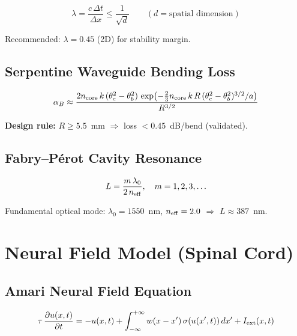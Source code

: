 \documentclass[12pt, a4paper]{article}
\begin{document}
\begin{equation}\label{eq:cfl}
  \lambda = \frac{c\,\Delta t}{\Delta x} \leq \frac{1}{\sqrt{d}}
  \qquad (d = \text{spatial dimension})
\end{equation}

Recommended: $\lambda = 0.45$ (2D) for stability margin.

\subsection{Serpentine Waveguide Bending Loss}

\begin{equation}\label{eq:bending_loss}
  \alpha_B \approx
  \frac{2n_{\rm core}\,k\,(\theta_c^2 - \theta_b^2)\,
        \exp\!\left(-\tfrac{2}{3}n_{\rm core}\,k\,R\,(\theta_c^2-\theta_b^2)^{3/2}/a\right)}
       {R^{3/2}}
\end{equation}

\textbf{Design rule:} $R \geq 5.5$~mm $\Rightarrow$ loss $< 0.45$~dB/bend (validated).

\subsection{Fabry–Pérot Cavity Resonance}

\begin{equation}\label{eq:fp_cavity}
  L = \frac{m\,\lambda_0}{2\,n_{\rm eff}}, \quad m = 1, 2, 3, \ldots
\end{equation}

Fundamental optical mode: $\lambda_0 = 1550$~nm, $n_{\rm eff} = 2.0$ $\Rightarrow$ $L \approx 387$~nm.

\section{Neural Field Model (Spinal Cord)}

\subsection{Amari Neural Field Equation}

\begin{equation}\label{eq:amari}
  \tau\,\frac{\partial u(x,t)}{\partial t}
  = -u(x,t)
    + \int_{-\infty}^{+\infty} w(x - x')\,\sigma(u(x',t))\,dx'
    + I_{\rm ext}(x,t)
\end{equation}
\end{document}
